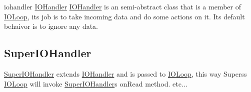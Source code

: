 iohandler \hyperlink{classIOHandler}{I\+O\+Handler} \hyperlink{classIOHandler}{I\+O\+Handler} is an semi-\/abstract class that is a member of \hyperlink{classIOLoop}{I\+O\+Loop}, its job is to take incoming data and do some actions on it. Its default behaivor is to ignore any data.\hypertarget{index_siohandler}{}\subsection{Super\+I\+O\+Handler}\label{index_siohandler}
\hyperlink{classSuperIOHandler}{Super\+I\+O\+Handler} extends \hyperlink{classIOHandler}{I\+O\+Handler} and is passed to \hyperlink{classIOLoop}{I\+O\+Loop}, this way Supers\textquotesingle{}s \hyperlink{classIOLoop}{I\+O\+Loop} will invoke \hyperlink{classSuperIOHandler}{Super\+I\+O\+Handler}\textquotesingle{}s on\+Read method. etc... 